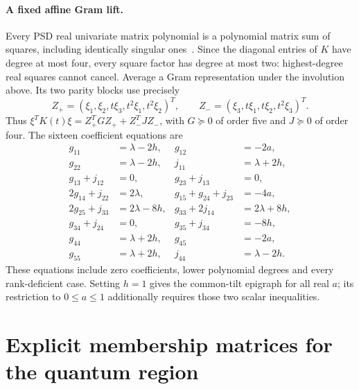 \documentclass[11pt]{article}
\begin{document}
\paragraph{A fixed affine Gram lift.}
Every PSD real univariate matrix polynomial is a polynomial matrix sum of squares,
including identically singular ones~\cite{hs}.
Since the diagonal entries of \(K\) have degree at most four, every square factor
has degree at most two: highest-degree real squares cannot cancel.
Average a Gram representation under the involution above. Its two parity blocks
use precisely
\[
 Z_+=(\xi_1,\xi_2,t\xi_3,t^2\xi_1,t^2\xi_2)^T,\qquad
 Z_-=(\xi_3,t\xi_1,t\xi_2,t^2\xi_3)^T.
\]
Thus \(\xi^TK(t)\xi=Z_+^TGZ_++Z_-^TJZ_-\), with
\(G\succeq0\) of order five and \(J\succeq0\) of order four.
The sixteen coefficient equations are
\begin{equation}
\begin{aligned}
 g_{11}&=\lambda-2h,&g_{12}&=-2a,\\
 g_{22}&=\lambda-2h,&j_{11}&=\lambda+2h,\\
 g_{13}+j_{12}&=0,&g_{23}+j_{13}&=0,\\
 2g_{14}+j_{22}&=2\lambda,&g_{15}+g_{24}+j_{23}&=-4a,\\
 2g_{25}+j_{33}&=2\lambda-8h,&g_{33}+2j_{14}&=2\lambda+8h,\\
 g_{34}+j_{24}&=0,&g_{35}+j_{34}&=-8h,\\
 g_{44}&=\lambda+2h,&g_{45}&=-2a,\\
 g_{55}&=\lambda+2h,&j_{44}&=\lambda-2h .
\end{aligned}
\label{eq:rows}
\end{equation}
These equations include zero coefficients, lower polynomial degrees and every
rank-deficient case. Setting \(h=1\) gives the common-tilt epigraph for all real
\(a\); its restriction to \(0\le a\le1\) additionally requires those two scalar
inequalities.

\section{Explicit membership matrices for the quantum region}
\end{document}
